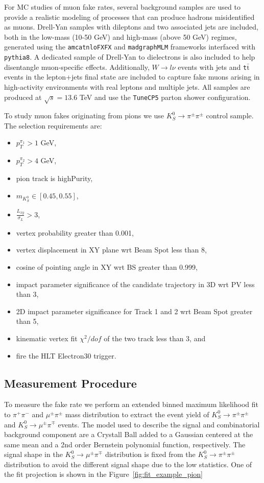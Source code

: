 For MC studies of muon fake rates, several background samples are used to provide a realistic modeling of processes that can produce hadrons misidentified as muons. Drell-Yan samples with dileptons and two associated jets are included, both in the low-mass (10-50 GeV) and high-mass (above 50 GeV) regimes, generated using the \texttt{amcatnloFXFX} and \texttt{madgraphMLM} frameworks interfaced with \texttt{pythia8}. A dedicated sample of Drell-Yan to dielectrons is also included to help disentangle muon-specific effects. Additionally, \texttt{$W\to l \nu$} events with jets and \texttt{t$\bar{\text{t}}$} events in the lepton+jets final state are included to capture fake muons arising in high-activity environments with real leptons and multiple jets. All samples are produced at $\sqrt{s} = 13.6$ TeV and use the \texttt{TuneCP5} parton shower configuration.

To study muon fakes originating from pions we use $K_S^0 \to \pi^\pm \pi^\pm$ control sample. The selection requirements are:
\begin{itemize}
\item $p_{T}^{\pi_1}>1$ GeV,
\item $p_{T}^{\pi_2}>4$ GeV,
\item pion track is highPurity,
\item $m_{K_S^0}\in[0.45,0.55]$,
\item $\frac{L_{xy}}{\sigma_L}>3$,
\item vertex probability greater than 0.001,
\item vertex displacement in XY plane wrt Beam Spot less than 8,
\item cosine of pointing angle in XY wrt BS greater than 0.999,
\item impact parameter significance of the candidate trajectory in 3D wrt PV less than 3,
\item 2D impact parameter significance for Track 1 and 2 wrt Beam Spot greater than 5,
\item kinematic vertex fit $\chi^{2}/dof$ of the two track less than 3, and
\item fire the HLT Electron30 trigger.
\end{itemize}


\subsection{Measurement Procedure}

To measure the fake rate we perform an extended binned maximum likelihood fit to
$\pi^{+}\pi^{-}$ and $\mu^{\pm}\pi^{\pm}$ mass distribution to extract
the event yield of $K_S^0 \to \pi^\pm \pi^\pm$ and $K_S^0 \to \mu^\pm \pi^\mp$ events. The model used to describe the signal and combinatorial background component are a Crystall Ball added to a  Gaussian centered at the same mean and a 2nd order Bernstein polynomial function, respectively. The signal shape in the $K_S^0 \to \mu^\pm \pi^\mp$ distribution is fixed from the $K_S^0 \to \pi^\pm \pi^\pm$  distribution to avoid the different signal shape due to the low statistics. One of the fit projection is shown in the Figure~\ref{fig:fit_example_pion}

